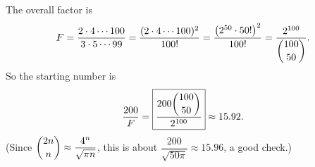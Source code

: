 The overall factor is
\[F=\dfrac{2\cdot4\cdots100}{3\cdot5\cdots99}=\dfrac{(2\cdot4\cdots100)^2}{100!}=\dfrac{\left(2^{50}\cdot50!\right)^2}{100!}=\dfrac{2^{100}}{\dbinom{100}{50}}.\]
So the starting number is
\[\dfrac{200}{F}=\boxed{\dfrac{200\dbinom{100}{50}}{2^{100}}}\approx15.92.\]
(Since $\dbinom{2n}{n}\approx\dfrac{4^n}{\sqrt{\pi n}}$, this is about $\dfrac{200}{\sqrt{50\pi}}\approx15.96$, a good check.)
